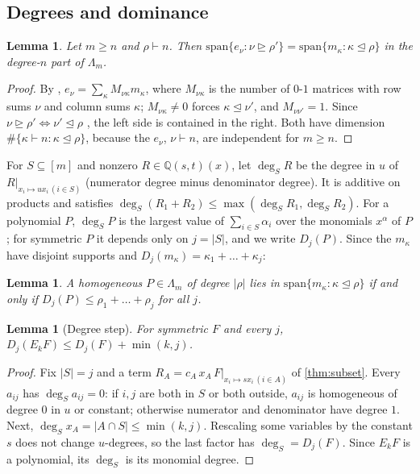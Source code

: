 \documentclass[11pt]{amsart}
\newtheorem{lemma}[theorem]{Lemma}
\theoremstyle{definition}
\theoremstyle{remark}
\numberwithin{equation}{section}
\newcommand{\Lam}{\Lambda}
\begin{document}
\subsection{Degrees and dominance}
\begin{lemma}\label{lem:e-m}
Let $m\ge n$ and $\rho\vdash n$. Then $\mathrm{span}\{e_\nu:\nu\trianglerighteq\rho'\}=\mathrm{span}\{m_\kappa:\kappa\trianglelefteq\rho\}$ in the degree-$n$ part of $\Lam_m$.
\end{lemma}
\begin{proof}
By \cite[I (6.6), (6.7)]{Macdonald95}, $e_\nu=\sum_\kappa M_{\nu\kappa}m_\kappa$, where $M_{\nu\kappa}$ is the number of $0$-$1$ matrices with row sums $\nu$ and column sums $\kappa$; $M_{\nu\kappa}\ne0$ forces $\kappa\trianglelefteq\nu'$, and $M_{\nu\nu'}=1$. Since $\nu\trianglerighteq\rho'\iff\nu'\trianglelefteq\rho$ \cite[I (1.11)]{Macdonald95}, the left side is contained in the right. Both have dimension $\#\{\kappa\vdash n:\kappa\trianglelefteq\rho\}$, because the $e_\nu$, $\nu\vdash n$, are independent for $m\ge n$.
\end{proof}

For $S\subseteq[m]$ and nonzero $R\in\mathbb{Q}(s,t)(x)$, let $\deg_SR$ be the degree in $u$ of $R|_{x_i\mapsto ux_i\,(i\in S)}$ (numerator degree minus denominator degree). It is additive on products and satisfies $\deg_S(R_1+R_2)\le\max(\deg_SR_1,\deg_SR_2)$. For a polynomial $P$, $\deg_SP$ is the largest value of $\sum_{i\in S}\alpha_i$ over the monomials $x^\alpha$ of $P$; for symmetric $P$ it depends only on $j=|S|$, and we write $D_j(P)$. Since the $m_\kappa$ have disjoint supports and $D_j(m_\kappa)=\kappa_1+\dots+\kappa_j$:

\begin{lemma}\label{lem:Dj}
A homogeneous $P\in\Lam_m$ of degree $|\rho|$ lies in $\mathrm{span}\{m_\kappa:\kappa\trianglelefteq\rho\}$ if and only if $D_j(P)\le\rho_1+\dots+\rho_j$ for all $j$.
\end{lemma}

\begin{lemma}[Degree step]\label{lem:degstep}
For symmetric $F$ and every $j$, $D_j(E_kF)\le D_j(F)+\min(k,j)$.
\end{lemma}
\begin{proof}
Fix $|S|=j$ and a term $R_A=c_A\,x_A\,F|_{x_i\mapsto sx_i\,(i\in A)}$ of \cref{thm:subset}. Every $a_{ij}$ has $\deg_S a_{ij}=0$: if $i,j$ are both in $S$ or both outside, $a_{ij}$ is homogeneous of degree $0$ in $u$ or constant; otherwise numerator and denominator have degree $1$. Next, $\deg_Sx_A=|A\cap S|\le\min(k,j)$. Rescaling some variables by the constant $s$ does not change $u$-degrees, so the last factor has $\deg_S=D_j(F)$. Since $E_kF$ is a polynomial, its $\deg_S$ is its monomial degree.
\end{proof}
\end{document}
